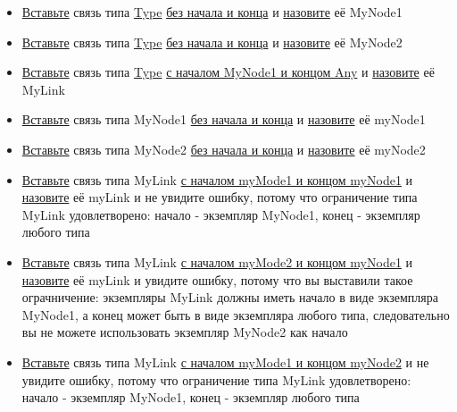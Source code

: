 \begin{itemize}
      \item \hyperlink{DeepCase.InsertLink.Description}{Вставьте} связь типа
            \hyperlink{Core.Type.Description}{Type}
            \hyperlink{FAQ.HowToInsertLinkWithoutFromAndTo}{без
                  начала и конца} и \hyperlink{FAQ.HowToSetName}{назовите} её
            MyNode1
      \item \hyperlink{DeepCase.InsertLink.Description}{Вставьте} связь типа
            \hyperlink{Core.Type.Description}{Type}
            \hyperlink{FAQ.HowToInsertLinkWithoutFromAndTo}{без
                  начала и конца} и \hyperlink{FAQ.HowToSetName}{назовите} её
            MyNode2
      \item \hyperlink{DeepCase.InsertLink.Description}{Вставьте} связь типа
            \hyperlink{Core.Type.Description}{Type}
            \hyperlink{FAQ.HowToInsertLinkWithFromAndTo}{с
                  началом MyNode1 и концом Any} и
            \hyperlink{FAQ.HowToSetName}{назовите} её
            MyLink
      \item \hyperlink{DeepCase.InsertLink.Description}{Вставьте} связь типа
            MyNode1
            \hyperlink{FAQ.HowToInsertLinkWithoutFromAndTo}{без начала и конца}
            и
            \hyperlink{FAQ.HowToSetName}{назовите} её myNode1
      \item \hyperlink{DeepCase.InsertLink.Description}{Вставьте} связь типа
            MyNode2
            \hyperlink{FAQ.HowToInsertLinkWithoutFromAndTo}{без начала и конца}
            и
            \hyperlink{FAQ.HowToSetName}{назовите} её myNode2
      \item \hyperlink{DeepCase.InsertLink.Description}{Вставьте} связь типа
            MyLink
            \hyperlink{FAQ.HowToInsertLinkWithFromAndTo}{с началом myMode1 и
                  концом
                  myNode1} и \hyperlink{FAQ.HowToSetName}{назовите} её myLink и
            не
            увидите
            ошибку, потому что ограничение типа MyLink удовлетворено: начало -
            экземпляр
            MyNode1, конец - экземпляр любого типа
      \item \hyperlink{DeepCase.InsertLink.Description}{Вставьте} связь типа
            MyLink
            \hyperlink{FAQ.HowToInsertLinkWithFromAndTo}{с началом myMode2 и
                  концом
                  myNode1} и \hyperlink{FAQ.HowToSetName}{назовите} её myLink и
            увидите
            ошибку,
            потому что вы выставили такое ограчничение: экземпляры MyLink
            должны
            иметь
            начало в виде экземпляра MyNode1, а конец может быть в виде
            экземпляра
            любого
            типа, следовательно вы не можете использовать экземпляр MyNode2 как
            начало
      \item \hyperlink{DeepCase.InsertLink.Description}{Вставьте} связь типа
            MyLink
            \hyperlink{FAQ.HowToInsertLinkWithFromAndTo}{с началом myMode1 и
                  концом
                  myNode2} и не увидите ошибку, потому что ограничение типа
            MyLink
            удовлетворено:
            начало - экземпляр MyNode1, конец - экземпляр любого типа
\end{itemize}
